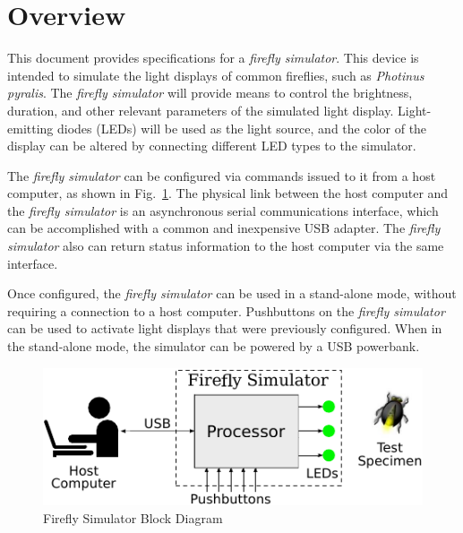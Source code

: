 \documentclass[letterpaper,11pt]{article}
\begin{document}
\section{Overview}

This document provides specifications for a \textit{firefly simulator}. This
device is intended to simulate the light displays of common fireflies, such
as \textit{Photinus pyralis}. The \textit{firefly simulator} will provide means
to control the brightness, duration, and other relevant parameters of the
simulated light display. Light-emitting diodes (LEDs) will be used as the light
source, and the color of the display can be altered by connecting different
LED types to the simulator.

The \textit{firefly simulator} can be configured via commands issued to it
from a host computer, as shown in Fig.\ \ref{fig:blockdiagram}. The physical
link between the host computer and the \textit{firefly simulator} is an
asynchronous serial communications interface, which can be accomplished with a
common and inexpensive USB adapter. The \textit{firefly simulator} also can
return status information to the host computer via the same interface.

Once configured, the \textit{firefly simulator} can be used in a stand-alone
mode, without requiring a connection to a host computer. Pushbuttons on the
\textit{firefly simulator} can be used to activate light displays that were
previously configured. When in the stand-alone mode, the simulator can be
powered by a USB powerbank.

\begin{figure}[h]
  \begin{center}
    \includegraphics[scale=1.5]{Flashes_BlockDiagram}
  \end{center}
  \vspace{-18pt}
  \caption{Firefly Simulator Block Diagram}
  \label{fig:blockdiagram}
\end{figure}
\end{document}
